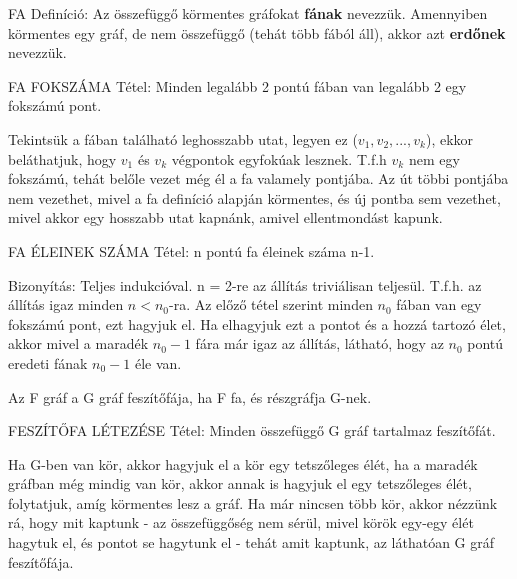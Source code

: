 \documentclass[]{article}
\begin{document}
\begin{shaded}
FA Definíció: Az összefüggő körmentes gráfokat \textbf{fának} nevezzük. Amennyiben körmentes egy gráf, de nem összefüggő (tehát több fából áll), akkor azt \textbf{erdőnek} nevezzük.
\end{shaded}
\begin{framed}
FA FOKSZÁMA Tétel: Minden legalább 2 pontú fában van legalább 2 egy fokszámú pont.
\end{framed}
\begin{leftbar}
Tekintsük a fában található leghosszabb utat, legyen ez ($v_1, v_2,..., v_k$), ekkor beláthatjuk, hogy $v_1$ és $v_k$ végpontok egyfokúak lesznek. T.f.h $v_k$ nem egy fokszámú, tehát belőle vezet még él a fa valamely pontjába. Az út többi pontjába nem vezethet, mivel a fa definíció alapján körmentes, és új pontba sem vezethet, mivel akkor egy hosszabb utat kapnánk, amivel ellentmondást kapunk.
\end{leftbar}
\begin{framed}
FA ÉLEINEK SZÁMA Tétel: n pontú fa éleinek száma n-1.
\end{framed}
\begin{leftbar}
Bizonyítás: Teljes indukcióval. n = 2-re az állítás triviálisan teljesül. T.f.h. az állítás igaz minden $n < n_0$-ra. Az előző tétel szerint minden $n_0$ fában van egy fokszámú pont, ezt hagyjuk el. Ha elhagyjuk ezt a pontot és a hozzá tartozó élet, akkor mivel a maradék $n_0 - 1$ fára már igaz az állítás, látható, hogy az $n_0$ pontú eredeti fának $n_0 - 1$ éle van.
\end{leftbar}
\begin{shaded}
Az F gráf a G gráf feszítőfája, ha F fa, és részgráfja G-nek.
\end{shaded}
\begin{framed}
FESZÍTŐFA LÉTEZÉSE Tétel: Minden összefüggő G gráf tartalmaz feszítőfát.
\end{framed}
\begin{leftbar}
Ha G-ben van kör, akkor hagyjuk el a kör egy tetszőleges élét, ha a maradék gráfban még mindig van kör, akkor annak is hagyjuk el egy tetszőleges élét, folytatjuk, amíg körmentes lesz a gráf. Ha már nincsen több kör, akkor nézzünk rá, hogy mit kaptunk - az összefüggőség nem sérül, mivel körök egy-egy élét hagytuk el, és pontot se hagytunk el - tehát amit kaptunk, az láthatóan G gráf feszítőfája.
\end{leftbar}
\end{document}
